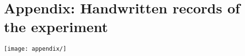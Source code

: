 \section{Appendix: Handwritten records of the experiment}
    \texttt{[image: appendix/]}
\clearpage

